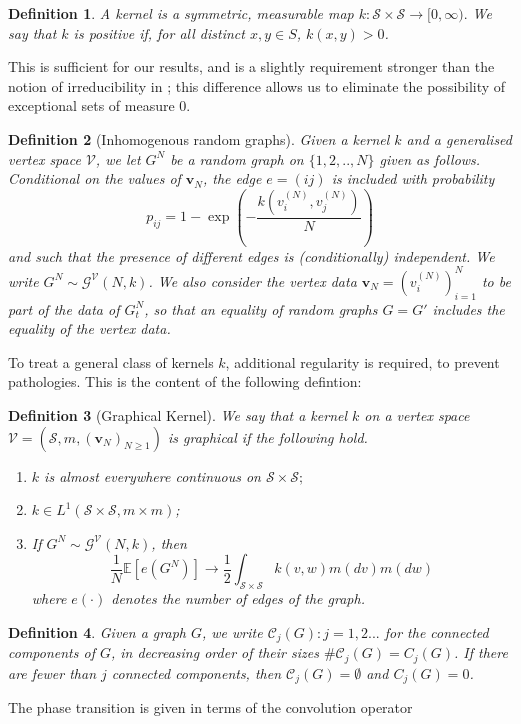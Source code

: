 \documentclass[11pt, notitlepage]{article}
\newtheorem{defn}{Definition}[section]
\begin{document}
\begin{defn}
    A \emph{kernel} is a symmetric, measurable map $k: \mathcal{S}\times \mathcal{S} \rightarrow [0, \infty).$ We say that $k$ is \emph{positive} if, for all distinct $x,y \in S$, $k(x,y)>0$. 
    \end{defn} This is sufficient for our results, and is a slightly requirement stronger than the notion of irreducibility in \cite{BJR07}; this difference allows us to eliminate the possibility of exceptional sets of measure $0$. \begin{defn}[Inhomogenous random graphs]\label{definition of GN} Given a kernel $k$ and a generalised vertex space $\mathcal{V}$, we let
    $G^N$ be a random graph on $\{1, 2,..,N\}$ given as follows. Conditional on the values of $\mathbf{v}_N$, the edge $e=(ij)$ is included with probability \begin{equation}
        p_{ij}=1-\exp\left(-\frac{k(v^{(N)}_i,v^{(N)}_j)}{N} \right)
    \end{equation} and such that the presence of different edges is (conditionally) independent. We write $G^N\sim\mathcal{G}^\mathcal{V}(N,k)$. We also consider the \emph{vertex data}  $\mathbf{v}_N=(v^{(N)}_i)_{i=1}^N$ to be part of the data of $G^N_t$, so that an equality of random graphs $G=G'$ includes the equality of the vertex data.
\end{defn} To treat a general class of kernels $k$, additional regularity is required, to prevent pathologies. This is the content of the following defintion: \begin{defn}[Graphical Kernel]
    We say that a kernel $k$ on a vertex space $\mathcal{V}=(\mathcal{S}, m, (\mathbf{v}_N)_{N\geq 1})$ is \emph{graphical} if the following hold. 
    \begin{enumerate}[label=\roman{*}).]
        \item $k$ is almost everywhere continuous on $\mathcal{S}\times\mathcal{S};$
        \item $k \in L^1(\mathcal{S}\times \mathcal{S}, m \times m)$;
        \item If $G^N \sim \mathcal{G}^\mathcal{V}(N,k)$, then
        \begin{equation}
            \frac{1}{N}\mathbb{E}\left[e\left(G^N\right)\right]\rightarrow \frac{1}{2}\int_{\mathcal{S}\times \mathcal{S}} k(v,w)m(dv)m(dw)
        \end{equation} where $e(\cdot)$ denotes the number of edges of the graph.
    \end{enumerate}
\end{defn}  \begin{defn}
 Given a graph $G$, we write $\mathcal{C}_j(G): j=1, 2...$ for the connected components of $G$, in decreasing order of their sizes $\#\mathcal{C}_j(G)=C_j(G)$. If there are fewer than $j$ connected components, then $\mathcal{C}_j(G)=\emptyset$ and $C_j(G)=0$.
\end{defn}The phase transition is given in terms of the convolution operator
\end{document}

